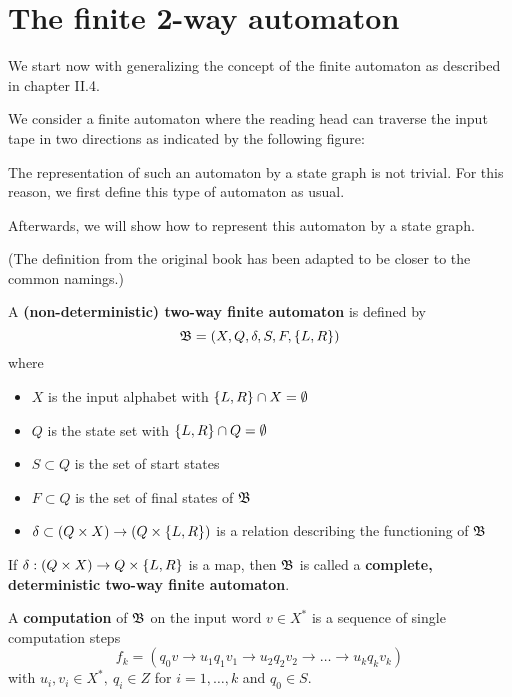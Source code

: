 \section{The finite 2-way automaton}

We start now with generalizing the concept of the finite automaton as described
in chapter II.4.

We consider a finite automaton where the reading head can traverse the input
tape in two directions as indicated by the following figure:

\begin{center}

\end{center}

The representation of such an automaton by a state graph is not trivial. For
this reason, we first define this type of automaton as usual.

Afterwards, we will show how to represent this automaton by a state graph.

(The definition from the original book has been adapted to be closer to the
common namings.)

\begin{definition}
A {\bf (non-deterministic) two-way finite automaton} is defined by
\[ \mbox{$\mathfrak{B}$} = (X, Q, \delta, S, F, \mbox{$\{L, R\}$}) \]
where 
\begin{itemize}
  \item $X$ is the input alphabet with $\mbox{$\{L, R\}$} \cap X = \emptyset$
  \item $Q$ is the state set with $\mbox{$\{L, R\}$} \cap Q = \emptyset$
  \item $S \subset Q$ is the set of start states
  \item $F \subset Q$ is the set of final states of $\mbox{$\mathfrak{B}$}$
  \item $\delta \subset (Q \times X) \to (Q \times \mbox{$\{L, R\}$})$ is a
  relation describing the functioning of $\mbox{$\mathfrak{B}$}$
\end{itemize}

If $\delta : (Q \times X) \to Q \times \mbox{$\{L, R\}$}$ is a map, then
$\mbox{$\mathfrak{B}$}$ is called a {\bf complete, deterministic two-way finite automaton}.
\end{definition}

\bigskip
\begin{definition}
A {\bf computation} of $\mbox{$\mathfrak{B}$}$ on the input word $v \in X^*$ is a sequence of
single computation steps
\[ f_k = (q_0 v \to u_1 q_1 v_1 \to u_2 q_2 v_2 \to \ldots \to u_k q_k v_k) \]
with $u_i, v_i \in X^*,\ q_i \in Z$ for $i = 1, \ldots, k$ and $q_0 \in S$. 
\end{definition}

